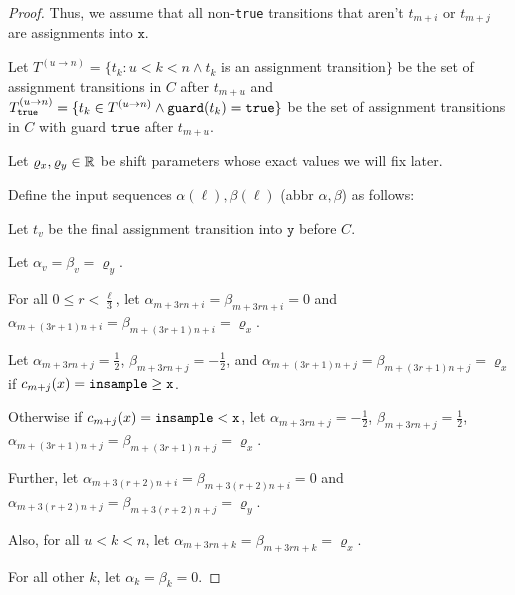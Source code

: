 \begin{proof}
	Thus, we assume that all non-\texttt{true} transitions that aren't $t_{m+i}$ or $t_{m+j}$ are assignments into $\texttt{x}$. 

	Let $T^{(u\to n)} = \{t_k: u<k<n\land t_k$ is an assignment transition$ \}$ be the set of assignment transitions in $C$ after $t_{m+u}$ and $T^{(u\to n)}_\texttt{true} = \{t_k\in T^{(u\to n)} \land \guard(t_k) = \texttt{true} \}$ be the set of assignment transitions in $C$ with guard $\texttt{true}$ after $t_{m+u}$.

	Let $\varrho_x, \varrho_y \in \RR$ be shift parameters whose exact values we will fix later. 

	Define the input sequences $\alpha(\ell), \beta(\ell)$ (abbr $\alpha, \beta$) as follows: 

	Let $t_v$ be the final assignment transition into $\texttt{y}$ before $C$. 

	Let $\alpha_v = \beta_v = \varrho_y$. 

	For all $0\leq r < \frac{\ell}{3}$, let $\alpha_{m+3rn+i} = \beta_{m+3rn+i} =0$ and $\alpha_{m+(3r+1)n+i} = \beta_{m+(3r+1)n+i} = \varrho_x$.
	
	Let $\alpha_{m+3rn+j} = \frac{1}{2}$, $\beta_{m+3rn+j} = -\frac{1}{2}$, and $\alpha_{m+(3r+1)n+j} = \beta_{m+(3r+1)n+j}=\varrho_x$ if $c_{m+j}(x) = \gguard[\texttt{x}]$.
	
	Otherwise if $c_{m+j}(x)=\lguard[\texttt{x}]$, let $\alpha_{m+3rn+j}=-\frac{1}{2}$, $\beta_{m+3rn+j} =\frac{1}{2}$, $\alpha_{m+(3r+1)n+j}=\beta_{m+(3r+1)n+j} =\varrho_x$.

	Further, let $\alpha_{m+3(r+2)n+i} =\beta_{m+3(r+2)n+i}=0$ and $\alpha_{m+3(r+2)n+j} =\beta_{m+3(r+2)n+j}=\varrho_y$.

	Also, for all $u<k<n$, let $\alpha_{m+3rn+k}=\beta_{m+3rn+k} = \varrho_x$.
		
	For all other $k$, let $\alpha_k=\beta_k=0$. 


\end{proof}
